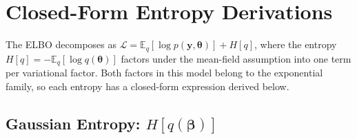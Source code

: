 \documentclass[11pt,a4paper]{article}
\begin{document}
\section{Closed-Form Entropy Derivations}\label{app:entropy}

The ELBO decomposes as $\mathcal{L} = \mathbb{E}_q[\log p(\bm{y},\bm{\theta})] + H[q]$,
where the entropy $H[q] = -\mathbb{E}_q[\log q(\bm{\theta})]$
factors under the mean-field assumption into one term per variational factor.
Both factors in this model belong to the exponential family,
so each entropy has a closed-form expression derived below.

\subsection{Gaussian Entropy: \texorpdfstring{$H[q(\bm{\beta})]$}{H[q(beta)]}}
\end{document}
